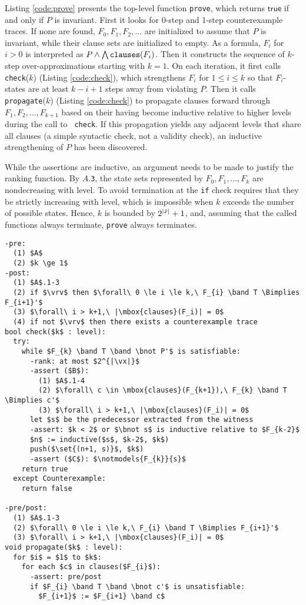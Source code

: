 \documentclass{llncs}
\newcommand{\set}[1]{ \{ #1 \} }
\newcommand{\band}{\wedge}
\newcommand{\bnot}{\neg}
\newcommand{\Bimplies}{\Rightarrow}
\newcommand{\vtrue}{\mathsf{true}}
\begin{document}
Listing \ref{code:prove} presents the top-level function {\tt prove},
which returns $\vtrue$ if and only if $P$ is invariant.  First it
looks for 0-step and 1-step counterexample traces.  If none are found,
$F_0,F_1,F_2,\ldots$ are initialized to assume that $P$ is invariant,
while their clause sets are initialized to empty.  As a formula, $F_i$
for $i > 0$ is interpreted as $P \band \bigwedge \mbox{\tt
  clauses}(F_i)$.  Then it constructs the sequence of $k$-step
over-approximations starting with $k=1$.  On each iteration, it first
calls {\tt check}($k$) (Listing \ref{code:check}), which strengthens
$F_{i}$ for $1 \le i \le k$ so that $F_{i}$-states are at least
$k-i+1$ steps away from violating $P$.  Then it calls {\tt
  propagate}($k$) (Listing \ref{code:check}) to propagate clauses
forward through $F_{1},F_{2},\ldots,F_{k+1}$ based on their having
become inductive relative to higher levels during the call to {\tt
  check}.  If this propagation yields any adjacent levels that share
all clauses (a simple syntactic check, not a validity check), an
inductive strengthening of $P$ has been discovered.

While the assertions are inductive, an argument needs to be made to
justify the ranking function.  By $A$.{\tt 3}, the state sets
represented by $F_{0},F_{1},\ldots,F_{k}$ are nondecreasing with
level.  To avoid termination at the {\tt if} check requires that they
be strictly increasing with level, which is impossible when $k$
exceeds the number of possible states.  Hence, $k$ is bounded by
$2^{|\bar{x}|}+1$, and, assuming that the called functions always
terminate, {\tt prove} always terminates.

\begin{lstlisting}[name=code,caption={The {\tt check} and {\tt propagate} functions},label=code:check,float=tb]
-pre:  
  (1) $A$
  (2) $k \ge 1$
-post: 
  (1) $A$.1-3
  (2) if $\vrv$ then $\forall\ 0 \le i \le k,\ F_{i} \band T \Bimplies F_{i+1}'$
  (3) $\forall\ i > k+1,\ |\mbox{clauses}(F_i)| = 0$
  (4) if not $\vrv$ then there exists a counterexample trace
bool check($k$ : level):
  try:
    while $F_{k} \band T \band \bnot P'$ is satisfiable:
      -rank: at most $2^{|\vx|}$
      -assert ($B$):
        (1) $A$.1-4
        (2) $\forall\ c \in \mbox{clauses}(F_{k+1}),\ F_{k} \band T \Bimplies c'$
        (3) $\forall\ i > k+1,\ |\mbox{clauses}(F_i)| = 0$
      let $s$ be the predecessor extracted from the witness
      -assert: $k < 2$ or $\bnot s$ is inductive relative to $F_{k-2}$
      $n$ := inductive($s$, $k-2$, $k$)
      push($\set{(n+1, s)}$, $k$)
      -assert ($C$): $\notmodels{F_{k}}{s}$
    return true
  except Counterexample:
    return false

-pre/post:
  (1) $A$.1-3
  (2) $\forall\ 0 \le i \le k,\ F_{i} \band T \Bimplies F_{i+1}'$
  (3) $\forall\ i > k+1,\ |\mbox{clauses}(F_i)| = 0$
void propagate($k$ : level):
  for $i$ = $1$ to $k$:
    for each $c$ in clauses($F_{i}$):
      -assert: pre/post
      if $F_{i} \band T \band \bnot c'$ is unsatisfiable:
        $F_{i+1}$ := $F_{i+1} \band c$
\end{lstlisting}
\end{document}
